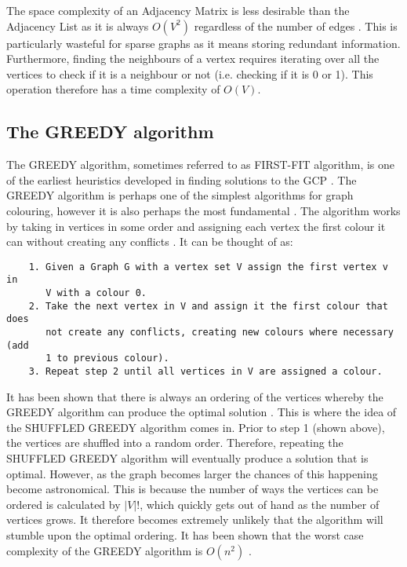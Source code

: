 The space complexity of an Adjacency Matrix is less desirable than the Adjacency List as it is always $O(V^2)$ regardless of the number of edges \cite{IntroAlgs}. This is particularly wasteful for sparse graphs as it means storing redundant information. Furthermore, finding the neighbours of a vertex requires iterating over all the vertices to check if it is a neighbour or not (i.e. checking if it is 0 or 1). This operation therefore has a time complexity of $O(V)$.

\subsection{The GREEDY algorithm}
The GREEDY algorithm, sometimes referred to as FIRST-FIT algorithm, is one of the earliest heuristics developed in finding solutions to the GCP \cite{LEWIS20121933}. The GREEDY algorithm is perhaps one of the simplest algorithms for graph colouring, however it is also perhaps the most fundamental \cite{LewisR.M.R2015AGtG}. The algorithm works by taking in vertices in some order and assigning each vertex the first colour it can without creating any conflicts \cite{LewisR.M.R2015AGtG}. It can be thought of as:
\begin{verbatim}
    1. Given a Graph G with a vertex set V assign the first vertex v in 
       V with a colour 0.
    2. Take the next vertex in V and assign it the first colour that does 
       not create any conflicts, creating new colours where necessary (add 
       1 to previous colour).
    3. Repeat step 2 until all vertices in V are assigned a colour.
\end{verbatim}
It has been shown that there is always an ordering of the vertices whereby the GREEDY algorithm can produce the optimal solution \cite{LewisR.M.R2015AGtG}. This is where the idea of the SHUFFLED GREEDY algorithm comes in. Prior to step 1 (shown above), the vertices are shuffled into a random order. Therefore, repeating the SHUFFLED GREEDY algorithm will eventually produce a solution that is optimal. However, as the graph becomes larger the chances of this happening become astronomical. This is because the number of ways the vertices can be ordered is calculated by $|V|!$, which quickly gets out of hand as the number of vertices grows. It therefore becomes extremely unlikely that the algorithm will stumble upon the optimal ordering. It has been shown that the worst case complexity of the GREEDY algorithm is $O(n^2)$ \cite{LewisR.M.R2015AGtG}.

